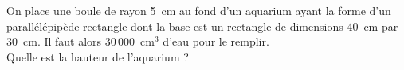 
On place une boule de rayon 5~cm au fond d'un aquarium ayant la forme d'un parallélépipède rectangle dont la base est un rectangle de dimensions 40~cm par 30~cm. Il faut alors 30\,000~cm$^3$ d'eau pour le remplir.
\\Quelle est la hauteur de l'aquarium ?

